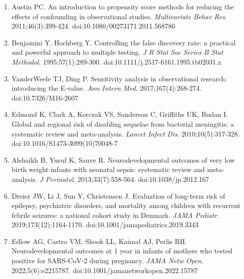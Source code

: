 \documentclass[11pt]{article}
\begin{document}
{\begin{enumerate}
  von Elm E, Altman DG, Egger M, Pocock SJ, Gøtzsche PC, Vandenbroucke JP. The Strengthening the Reporting of Observational Studies in Epidemiology (STROBE) statement: guidelines for reporting
  observational studies. \emph{Lancet}. 2007;370(9596):1453-1457. doi:10.1016/S0140-6736(07)61602-X
\item
  Austin PC. An introduction to propensity score methods for reducing the effects of confounding in observational studies. \emph{Multivariate Behav Res}. 2011;46(3):399-424.
  doi:10.1080/00273171.2011.568786
\item
  Benjamini Y, Hochberg Y. Controlling the false discovery rate: a practical and powerful approach to multiple testing. \emph{J R Stat Soc Series B Stat Methodol}. 1995;57(1):289-300.
  doi:10.1111/j.2517-6161.1995.tb02031.x
\item
  VanderWeele TJ, Ding P. Sensitivity analysis in observational research: introducing the E-value. \emph{Ann Intern Med}. 2017;167(4):268-274. doi:10.7326/M16-2607
\item
  Edmond K, Clark A, Korczak VS, Sanderson C, Griffiths UK, Rudan I. Global and regional risk of disabling sequelae from bacterial meningitis: a systematic review and meta-analysis. \emph{Lancet
  Infect Dis}. 2010;10(5):317-328. doi:10.1016/S1473-3099(10)70048-7
\item
  Alshaikh B, Yusuf K, Sauve R. Neurodevelopmental outcomes of very low birth weight infants with neonatal sepsis: systematic review and meta-analysis. \emph{J Perinatol}. 2013;33(7):558-564.
  doi:10.1038/jp.2012.167
\item
  Dreier JW, Li J, Sun Y, Christensen J. Evaluation of long-term risk of epilepsy, psychiatric disorders, and mortality among children with recurrent febrile seizures: a national cohort study in
  Denmark. \emph{JAMA Pediatr}. 2019;173(12):1164-1170. doi:10.1001/jamapediatrics.2019.3343
\item
  Edlow AG, Castro VM, Shook LL, Kaimal AJ, Perlis RH. Neurodevelopmental outcomes at 1 year in infants of mothers who tested positive for SARS-CoV-2 during pregnancy. \emph{JAMA Netw Open}.
  2022;5(6):e2215787. doi:10.1001/jamanetworkopen.2022.15787
\end{enumerate}}
\end{document}

